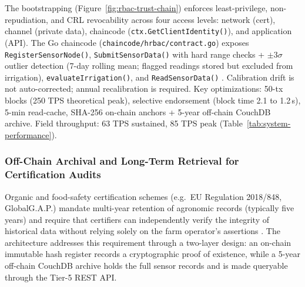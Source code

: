 \documentclass[pdflatex,sn-mathphys-num]{sn-jnl}
\theoremstyle{thmstyleone}
\theoremstyle{thmstyletwo}
\theoremstyle{thmstylethree}
\begin{document}
The bootstrapping (Figure~\ref{fig:rbac-trust-chain}) enforces least-privilege, non-repudiation, and CRL revocability across four access levels: network (cert), channel (private data), chaincode (\texttt{ctx.GetClientIdentity()}), and application (API). The Go chaincode (\texttt{chaincode/hrbac/contract.go}) exposes \texttt{RegisterSensorNode()}, \texttt{SubmitSensorData()} with hard range checks + $\pm3\sigma$ outlier detection (7-day rolling mean; flagged readings stored but excluded from irrigation), \texttt{evaluateIrrigation()}, and \texttt{ReadSensorData()} \cite{orderingServiceDoc,mdpiAccessControl}. Calibration drift is not auto-corrected; annual recalibration is required. Key optimizations: 50-tx blocks (250 TPS theoretical peak), selective endorsement (block time 2.1 to 1.2\,s), 5-min read-cache, SHA-256 on-chain anchors + 5-year off-chain CouchDB archive. Field throughput: 63 TPS sustained, 85 TPS peak (Table~\ref{tab:system-performance}).

\subsubsection{Off-Chain Archival and Long-Term Retrieval for Certification Audits}
\label{subsubsec:offchain_archive}

Organic and food-safety certification schemes (e.g.\ EU Regulation 2018/848, GlobalG.A.P.) mandate multi-year retention of agronomic records (typically five years) and require that certifiers can independently verify the integrity of historical data without relying solely on the farm operator's assertions \cite{christidis2016blockchain,privateDataDoc}. The architecture addresses this requirement through a two-layer design: an on-chain immutable hash register records a cryptographic proof of existence, while a 5-year off-chain CouchDB archive holds the full sensor records and is made queryable through the Tier-5 REST API.
\end{document}
